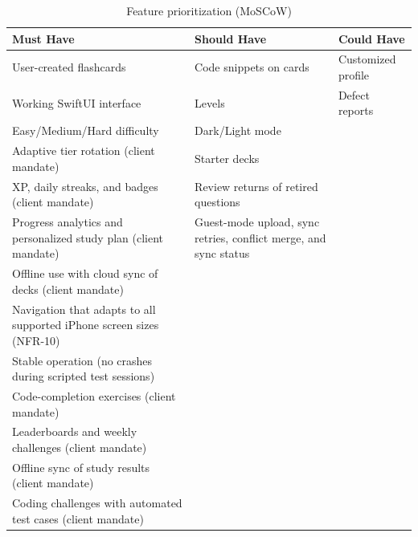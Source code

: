 \documentclass[12pt,letterpaper]{article}
\begin{document}
\begin{table}[H]
\centering
\caption{Feature prioritization (MoSCoW)}
\label{tab:moscow}
\begin{tabularx}{\textwidth}{@{}Y Y Y@{}}
\toprule
\textbf{Must Have} & \textbf{Should Have} & \textbf{Could Have} \\
\midrule
User-created flashcards & Code snippets on cards & Customized profile \\
Working SwiftUI interface & Levels & Defect reports \\
Easy/Medium/Hard difficulty & Dark/Light mode & \\
Adaptive tier rotation (client mandate) & Starter decks & \\
XP, daily streaks, and badges (client mandate) & Review returns of retired questions & \\
Progress analytics and personalized study plan (client mandate) & Guest-mode upload, sync retries, conflict merge, and sync status & \\
Offline use with cloud sync of decks (client mandate) & & \\
Navigation that adapts to all supported iPhone screen sizes (NFR-10) & & \\
Stable operation (no crashes during scripted test sessions) & & \\
Code-completion exercises (client mandate) & & \\
Leaderboards and weekly challenges (client mandate) & & \\
Offline sync of study results (client mandate) & & \\
Coding challenges with automated test cases (client mandate) & & \\
\bottomrule
\end{tabularx}
\end{table}

\end{document}

